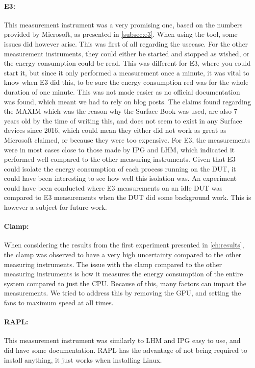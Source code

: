 \paragraph*{E3:} This measurement instrument was a very promising one, based on the numbers provided by Microsoft, as presented in \cref{subsec:e3}. When using the tool, some issues did however arise. This was first of all regarding the usecase. For the other measurement instruments, they could either be started and stopped as wished, or the energy consumption could be read. This was different for E3, where you could start it, but since it only performed a measurement once a minute, it was vital to know when E3 did this, to be sure the energy consumption red was for the whole duration of one minute. This was not made easier as no official documentation was found, which meant we had to rely on blog posts. The claims found regarding the MAXIM which was the reason why the Surface Book was used, are also 7 years old by the time of writing this, and does not seem to exist in any Surface devices since 2016, which could mean they either did not work as great as Microsoft claimed, or because they were too expensive. For E3, the measurements were in most cases close to those made by IPG and LHM, which indicated it performed well compared to the other measuring instruments. Given that E3 could isolate the energy consumption of each process running on the DUT, it could have been interesting to see how well this isolation was. An experiment could have been conducted where E3 measurements on an idle DUT was compared to E3 measurements when the DUT did some background work. This is however a subject for future work.


\paragraph*{Clamp:} When considering the results from the first experiment presented in \cref{ch:results}, the clamp was observed to have a very high uncertainty compared to the other measuring instruments. The issue with the clamp compared to the other measuring instruments is how it measures the energy consumption of the entire system compared to just the CPU. Because of this, many factors can impact the measurements. We tried to address this by removing the GPU, and setting the fans to maximum speed at all times.


\paragraph*{RAPL:} This measurement instrument was similarly to LHM and IPG easy to use, and did have some documentation. RAPL has the advantage of not being required to install anything, it just works when installing Linux.

